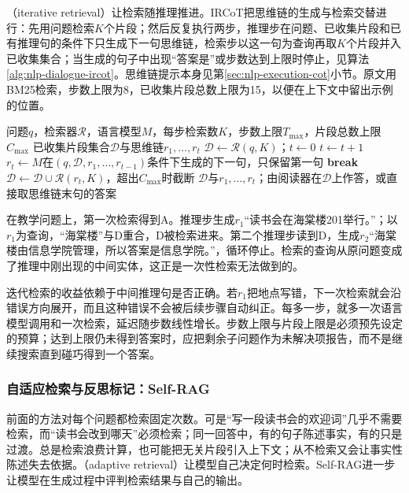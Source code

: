 （iterative retrieval）让检索随推理推进。IRCoT把思维链的生成与检索交替进行：先用问题检索$K$个片段；然后反复执行两步，推理步在问题、已收集片段和已有推理句的条件下只生成下一句思维链，检索步以这一句为查询再取$K$个片段并入已收集集合；当生成的句子中出现“答案是”或步数达到上限时停止，见算法\ref{alg:nlp-dialogue-ircot}。思维链提示本身见第\ref{sec:nlp-execution-cot}小节。原文用BM25检索，步数上限为8，已收集片段总数上限为15，以便在上下文中留出示例的位置。

\begin{algorithm}
  \label{alg:nlp-dialogue-ircot}
  \begin{algorithmic}[1]
    \Require 问题$q$，检索器$\mathcal R$，语言模型$M$，每步检索数$K$，步数上限$T_{\max}$，片段总数上限$C_{\max}$
    \Ensure 已收集片段集合$\mathcal D$与思维链$r_1,\ldots,r_t$
    \State $\mathcal D\gets\mathcal R(q,K)$；$t\gets0$
    \Repeat
      \State $t\gets t+1$
      \State $r_t\gets M$在$(q,\mathcal D,r_1,\ldots,r_{t-1})$条件下生成的下一句，只保留第一句
        \State \textbf{break}
      \EndIf
      \State $\mathcal D\gets\mathcal D\cup\mathcal R(r_t,K)$，超出$C_{\max}$时截断
    \State \Return $\mathcal D$与$r_1,\ldots,r_t$；由阅读器在$\mathcal D$上作答，或直接取思维链末句的答案
  \end{algorithmic}
\end{algorithm}

在教学问题上，第一次检索得到A。推理步生成$r_1$“读书会在海棠楼201举行。”；以$r_1$为查询，“海棠楼”与D重合，D被检索进来。第二个推理步读到D，生成$r_2$“海棠楼由信息学院管理，所以答案是信息学院。”，循环停止。检索的查询从原问题变成了推理中刚出现的中间实体，这正是一次性检索无法做到的。

迭代检索的收益依赖于中间推理句是否正确。若$r_1$把地点写错，下一次检索就会沿错误方向展开，而且这种错误不会被后续步骤自动纠正。每多一步，就多一次语言模型调用和一次检索，延迟随步数线性增长。步数上限与片段上限是必须预先设定的预算；达到上限仍未得到答案时，应把剩余子问题作为未解决项报告，而不是继续搜索直到碰巧得到一个答案。

\subsubsection{自适应检索与反思标记：Self-RAG}
\label{sec:nlp-dialogue-self-rag}

前面的方法对每个问题都检索固定次数。可是“写一段读书会的欢迎词”几乎不需要检索，而“读书会改到哪天”必须检索；同一回答中，有的句子陈述事实，有的只是过渡。总是检索浪费计算，也可能把无关片段引入上下文；从不检索又会让事实性陈述失去依据。（adaptive retrieval）让模型自己决定何时检索。Self-RAG进一步让模型在生成过程中评判检索结果与自己的输出。

